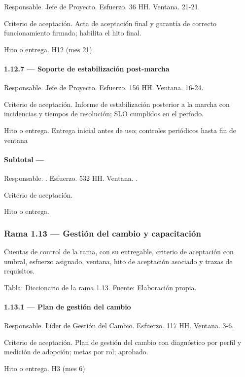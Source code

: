 \documentclass[11pt]{article}
\begin{document}
Responsable. Jefe de Proyecto. Esfuerzo. 36 HH. Ventana. 21-21.

Criterio de aceptación. Acta de aceptación final y garantía de correcto funcionamiento firmada; habilita el hito final.

Hito o entrega. H12 (mes 21)

\paragraph{1.12.7 — Soporte de estabilización post-marcha}

Responsable. Jefe de Proyecto. Esfuerzo. 156 HH. Ventana. 16-24.

Criterio de aceptación. Informe de estabilización posterior a la marcha con incidencias y tiempos de resolución; SLO cumplidos en el período.

Hito o entrega. Entrega inicial antes de uso; controles periódicos hasta fin de ventana

\paragraph{Subtotal — }

Responsable. . Esfuerzo. 532 HH. Ventana. .

Criterio de aceptación.

Hito o entrega.

\subsubsection{Rama 1.13 — Gestión del cambio y capacitación}

Cuentas de control de la rama, con su entregable, criterio de aceptación con umbral, esfuerzo asignado, ventana, hito de aceptación asociado y trazas de requisitos.

Tabla: Diccionario de la rama 1.13. Fuente: Elaboración propia.

\paragraph{1.13.1 — Plan de gestión del cambio}

Responsable. Líder de Gestión del Cambio. Esfuerzo. 117 HH. Ventana. 3-6.

Criterio de aceptación. Plan de gestión del cambio con diagnóstico por perfil y medición de adopción; metas por rol; aprobado.

Hito o entrega. H3 (mes 6)
\end{document}
